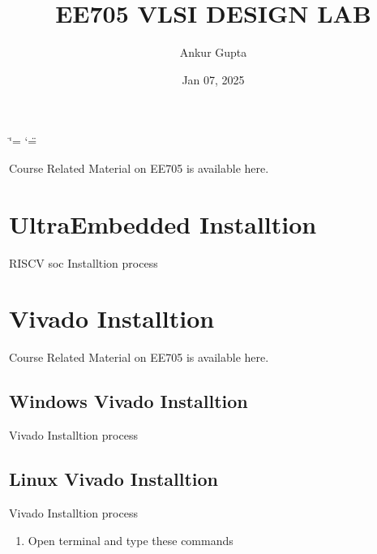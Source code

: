 \documentclass[letterpaper,10pt,english]{sphinxmanual}
\title{EE705 VLSI DESIGN LAB}
\date{Jan 07, 2025}
\author{Ankur Gupta}
\begin{document}
\ifdefined\shorthandoff
  \ifnum\catcode`\=\string=\active\shorthandoff{=}\fi
  \ifnum\catcode`\"=\active{}\fi
\fi

\pagestyle{empty}
\sphinxmaketitle
\pagestyle{plain}
\sphinxtableofcontents
\pagestyle{normal}
\label{\detokenize{index::doc}}


\sphinxAtStartPar
Course Related Material on EE705 is available here.

\sphinxstepscope


\chapter{UltraEmbedded Installtion}
\label{\detokenize{UltraEmbedded Installtion:ultraembedded-installtion}}\label{\detokenize{UltraEmbedded Installtion::doc}}
\sphinxAtStartPar
RISC\sphinxhyphen{}V soc Installtion process

\sphinxstepscope


\chapter{Vivado Installtion}
\label{\detokenize{Vivado_Installtion/index:vivado-installtion}}\label{\detokenize{Vivado_Installtion/index::doc}}
\sphinxAtStartPar
Course Related Material on EE705 is available here.

\sphinxstepscope


\section{Windows Vivado Installtion}
\label{\detokenize{Vivado_Installtion/Windows_Vivado_Installtion:windows-vivado-installtion}}\label{\detokenize{Vivado_Installtion/Windows_Vivado_Installtion::doc}}
\sphinxAtStartPar
Vivado Installtion process

\sphinxstepscope


\section{Linux Vivado Installtion}
\label{\detokenize{Vivado_Installtion/Linux_Vivado_Installtion:linux-vivado-installtion}}\label{\detokenize{Vivado_Installtion/Linux_Vivado_Installtion::doc}}
\sphinxAtStartPar
Vivado Installtion process
\begin{enumerate}
%
\item {} 
\sphinxAtStartPar
Open terminal and type these commands

\end{enumerate}
\end{document}
